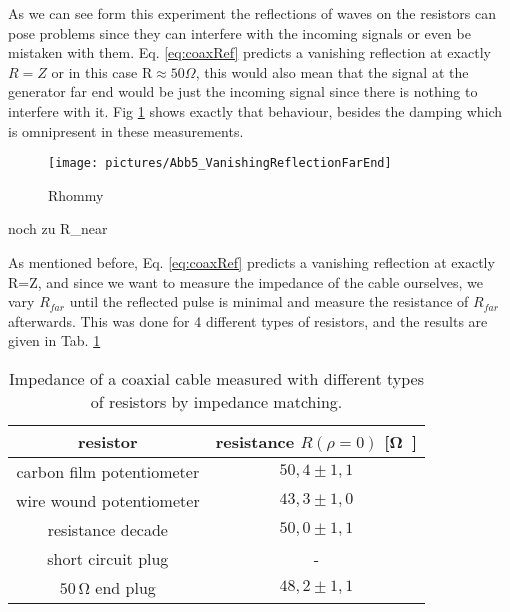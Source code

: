 \documentclass[a4paper,10pt,twocolumn]{article}
\begin{document}
    As we can see form this experiment the reflections of waves on the resistors can pose problems since they can interfere with the incoming signals or even be mistaken with them.
    Eq. \ref{eq:coaxRef} predicts a vanishing reflection at exactly $R=Z$ or in this case R$\approx 50\Omega$, this would also mean that the signal at the generator far end would be just the incoming signal since there is nothing to interfere with it.
    Fig \ref{fig:VanishingReflectionFarEnd} shows exactly that behaviour, besides the damping which is omnipresent in these measurements.
    \begin{figure}[htbp]                                 
        \begin{center}                                       
            \texttt{[image: pictures/Abb5\_VanishingReflectionFarEnd]}      
            \caption[]{Rhommy}   %
            \label{fig:VanishingReflectionFarEnd}                                      
        \end{center}
    \end{figure}
    
    noch zu R_{near}
    
    As mentioned before, Eq. \ref{eq:coaxRef} predicts a vanishing reflection at exactly R=Z, and since we want to measure the impedance of the cable ourselves, we vary $R_{far}$ until the reflected pulse is minimal and measure the resistance of $R_{far}$ afterwards.
    This was done for 4 different types of resistors, and the results are given in Tab. \ref{tab:impedance}
    \begin{table}[htbp]          %
        \centering
        \begin{tabular*}{\linewidth}{@{\extracolsep{\fill}}cc}
            \hline
            \hline
            \rule[-7pt]{0pt}{23pt}  resistor  &  resistance $R(\rho=0)$ [\si\ohm]  	 \\
            \hline
            \rule[-5pt]{0pt}{23pt}   carbon film potentiometer   &   $50,4 \pm 1,1$  	 \\
            \rule[-5pt]{0pt}{23pt}   wire wound potentiometer   &   $43,3 \pm 1,0$  	 \\
            \rule[-5pt]{0pt}{23pt}   resistance decade   &   $50,0 \pm 1,1$  	 \\
            \rule[-5pt]{0pt}{23pt}   short circuit plug   &   -  	 \\
            \rule[-5pt]{0pt}{23pt}   $50\,\si\ohm$ end plug   &   $48,2 \pm 1,1$  	 \\
            \hline
            \hline
        \end{tabular*}
        \normalsize
        \caption[]{Impedance of a coaxial cable measured with different types of resistors by impedance matching.}  %
        \label{tab:impedance}                             %
    \end{table}
    
\end{document}
